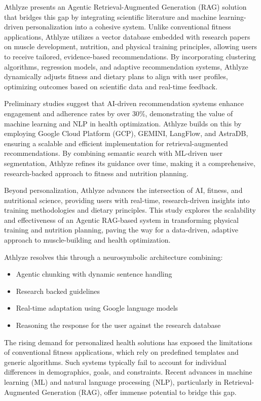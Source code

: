 \documentclass[conference]{IEEEtran}
\begin{document}
Athlyze presents an Agentic Retrieval-Augmented Generation (RAG) solution that bridges this gap by integrating scientific literature and machine learning-driven personalization into a cohesive system. Unlike conventional fitness applications, Athlyze utilizes a vector database embedded with research papers on muscle development, nutrition, and physical training principles, allowing users to receive tailored, evidence-based recommendations. By incorporating clustering algorithms, regression models, and adaptive recommendation systems, Athlyze dynamically adjusts fitness and dietary plans to align with user profiles, optimizing outcomes based on scientific data and real-time feedback.

Preliminary studies suggest that AI-driven recommendation systems enhance engagement and adherence rates by over 30\%, demonstrating the value of machine learning and NLP in health optimization. Athlyze builds on this by employing Google Cloud Platform (GCP), GEMINI, LangFlow, and AstraDB, ensuring a scalable and efficient implementation for retrieval-augmented recommendations. By combining semantic search with ML-driven user segmentation, Athlyze refines its guidance over time, making it a comprehensive, research-backed approach to fitness and nutrition planning.

Beyond personalization, Athlyze advances the intersection of AI, fitness, and nutritional science, providing users with real-time, research-driven insights into training methodologies and dietary principles. This study explores the scalability and effectiveness of an Agentic RAG-based system in transforming physical training and nutrition planning, paving the way for a data-driven, adaptive approach to muscle-building and health optimization.

Athlyze resolves this through a neurosymbolic architecture combining:

\begin{itemize}
    \item Agentic chunking with dynamic sentence handling
    \item Research backed guidelines
    \item Real-time adaptation using Google language models
    \item Reasoning the response for the user against the research database
\end{itemize}

The rising demand for personalized health solutions has exposed the limitations of conventional fitness applications, which rely on predefined templates and generic algorithms. Such systems typically fail to account for individual differences in demographics, goals, and constraints. Recent advances in machine learning (ML) and natural language processing (NLP), particularly in Retrieval-Augmented Generation (RAG), offer immense potential to bridge this gap.
\end{document}
